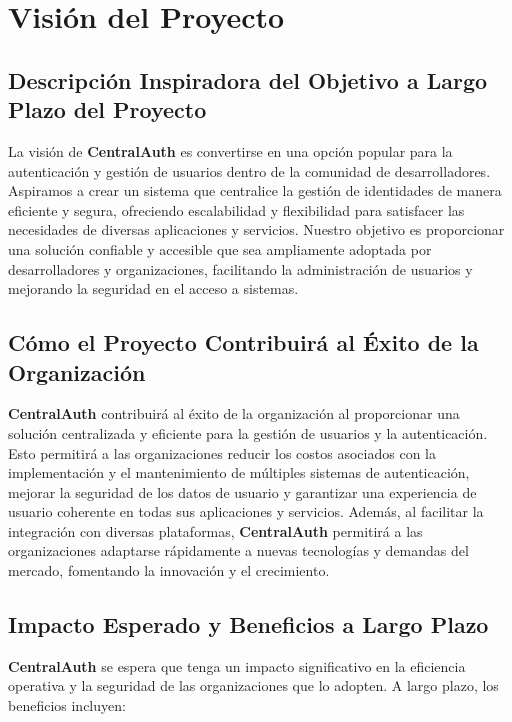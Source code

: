 \section{Visión del Proyecto}

\subsection{Descripción Inspiradora del Objetivo a Largo Plazo del Proyecto}

La visión de \textbf{CentralAuth} es convertirse en una opción popular para la autenticación y gestión de usuarios dentro de la comunidad de desarrolladores. Aspiramos a crear un sistema que centralice la gestión de identidades de manera eficiente y segura, ofreciendo escalabilidad y flexibilidad para satisfacer las necesidades de diversas aplicaciones y servicios. Nuestro objetivo es proporcionar una solución confiable y accesible que sea ampliamente adoptada por desarrolladores y organizaciones, facilitando la administración de usuarios y mejorando la seguridad en el acceso a sistemas.

\subsection{Cómo el Proyecto Contribuirá al Éxito de la Organización}

\textbf{CentralAuth} contribuirá al éxito de la organización al proporcionar una solución centralizada y eficiente para la gestión de usuarios y la autenticación. Esto permitirá a las organizaciones reducir los costos asociados con la implementación y el mantenimiento de múltiples sistemas de autenticación, mejorar la seguridad de los datos de usuario y garantizar una experiencia de usuario coherente en todas sus aplicaciones y servicios. Además, al facilitar la integración con diversas plataformas, \textbf{CentralAuth} permitirá a las organizaciones adaptarse rápidamente a nuevas tecnologías y demandas del mercado, fomentando la innovación y el crecimiento.

\subsection{Impacto Esperado y Beneficios a Largo Plazo}

\textbf{CentralAuth} se espera que tenga un impacto significativo en la eficiencia operativa y la seguridad de las organizaciones que lo adopten. A largo plazo, los beneficios incluyen:

